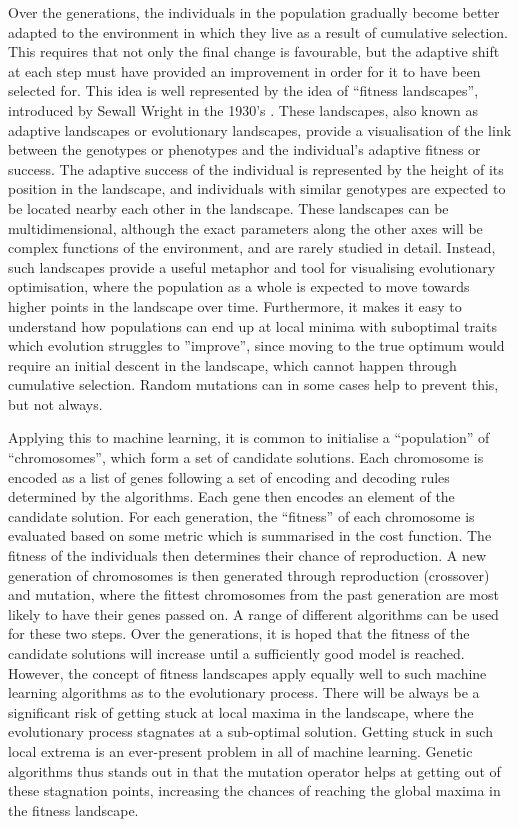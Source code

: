 \documentclass[multicolumn, 12pt]{extarticle}
\begin{document}
Over the generations, the individuals in the population gradually become better adapted to the environment in which they live as a result of cumulative selection. This requires that not only the final change is favourable, but the adaptive shift at each step must have provided an improvement in order for it to have been selected for.  This idea is well represented by the idea of ``fitness landscapes'', introduced by Sewall Wright in the 1930's \cite{Sewall}. These landscapes, also known as adaptive landscapes or evolutionary landscapes, provide a visualisation of the link between the genotypes or phenotypes and the individual's adaptive fitness or success. The adaptive success of the individual is represented by the height of its position in the landscape, and individuals with similar genotypes are expected to be located nearby each other in the landscape. These landscapes can be multidimensional, although the exact parameters along the other axes will be complex functions of the environment, and are rarely studied in detail. Instead, such landscapes provide a useful metaphor and tool for visualising evolutionary optimisation, where the population as a whole is expected to move towards higher points in the landscape over time. Furthermore, it makes it easy to understand how populations can end up at local minima with suboptimal traits which evolution struggles to ''improve'', since moving to the true optimum would require an initial descent in the landscape, which cannot happen through cumulative selection. Random mutations can in some cases help to prevent this, but not always.

Applying this to machine learning, it is common to initialise a ``population'' of ``chromosomes'', which form a set of candidate solutions. Each chromosome is encoded as a list of genes following a set of encoding and decoding rules determined by the algorithms. Each gene then encodes an element of the candidate solution. For each generation, the ``fitness'' of each chromosome is evaluated based on some metric which is summarised in the cost function. The fitness of the individuals then determines their chance of reproduction.
A new generation of chromosomes is then generated through reproduction (crossover) and mutation, where the fittest chromosomes from the past generation are most likely to have their genes passed on. A range of different algorithms can be used for these two steps. Over the generations, it is hoped that the fitness of the candidate solutions will increase until a sufficiently good model is reached. However, the concept of fitness landscapes apply equally well to such machine learning algorithms as to the evolutionary process. There will be always be a significant risk of getting stuck at local maxima in the landscape, where the evolutionary process stagnates at a sub-optimal solution. Getting stuck in such local extrema is an ever-present problem in all of machine learning. Genetic algorithms thus stands out in that the mutation operator helps at getting out of these stagnation points, increasing the chances of reaching the global maxima in the fitness landscape.
\end{document}
